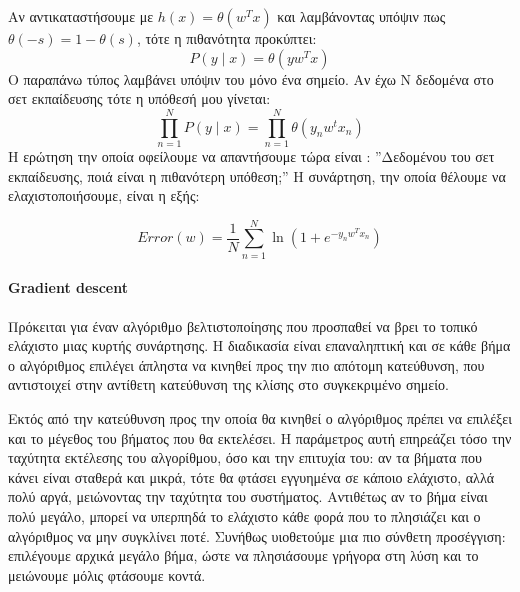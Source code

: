 Αν αντικαταστήσουμε με $h(x)=\theta(w^T x)$ και λαμβάνοντας υπόψιν πως $\theta(-s)= 1 - \theta(s)$, τότε η πιθανότητα  προκύπτει:
\begin{equation}
P(y \mid x)= \theta(y w^T x)
\end{equation}
Ο παραπάνω τύπος λαμβάνει υπόψιν του μόνο ένα σημείο. Αν έχω N δεδομένα στο σετ εκπαίδευσης τότε η υπόθεσή μου γίνεται:
\begin{equation}
\prod_{n=1}^{N} P(y \mid x)= \prod_{n=1}^{N} \theta (y_n w^t x_n)
\end{equation}
Η ερώτηση την οποία οφείλουμε να απαντήσουμε τώρα είναι : ”Δεδομένου του σετ εκπαίδευσης, ποιά είναι η πιθανότερη υπόθεση;” Η συνάρτηση, την οποία θέλουμε να ελαχιστοποιήσουμε, είναι η εξής:

\begin{equation}
Error(w)= \frac{1}{N} \sum_{n=1}^{N} \ln (1 + e^{- y_n w^T x_n} )
\end{equation}

\paragraph{Gradient descent} Πρόκειται για έναν αλγόριθμο βελτιστοποίησης που προσπαθεί να βρει το τοπικό ελάχιστο μιας κυρτής συνάρτησης. Η διαδικασία είναι επαναληπτική και σε κάθε βήμα ο αλγόριθμος επιλέγει άπληστα να κινηθεί προς την πιο απότομη κατεύθυνση, που αντιστοιχεί στην αντίθετη κατεύθυνση της κλίσης στο συγκεκριμένο σημείο.

Εκτός από την κατεύθυνση προς την οποία θα κινηθεί ο αλγόριθμος πρέπει να επιλέξει και το μέγεθος του βήματος που θα εκτελέσει. Η παράμετρος αυτή επηρεάζει τόσο την ταχύτητα εκτέλεσης του αλγορίθμου, όσο και την επιτυχία του: αν τα βήματα που κάνει είναι σταθερά και μικρά, τότε θα φτάσει εγγυημένα σε κάποιο ελάχιστο, αλλά πολύ αργά, μειώνοντας την ταχύτητα του συστήματος. Αντιθέτως αν το βήμα είναι πολύ μεγάλο, μπορεί να υπερπηδά το ελάχιστο κάθε φορά που το πλησιάζει και ο αλγόριθμος να μην συγκλίνει ποτέ. Συνήθως υιοθετούμε μια πιο σύνθετη προσέγγιση: επιλέγουμε αρχικά μεγάλο βήμα, ώστε να πλησιάσουμε γρήγορα στη λύση και το μειώνουμε μόλις φτάσουμε κοντά.
